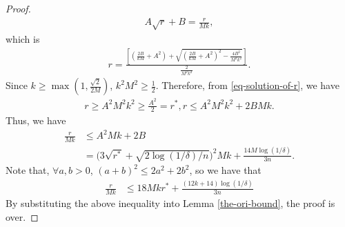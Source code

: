 \documentclass[10pt]{llncs}
\begin{document}
\begin{proof}
\begin{align*}
  A\sqrt{r}+B=\frac{r}{Mk},
\end{align*}
which is
\begin{align}
\label{eq-solution-of-r}
  r=\frac{\left[
  \left(
    \frac{2B}{kM}+A^2
    \right)+
    \sqrt{\left(
    \frac{2B}{kM}+A^2
    \right)^2-\frac{4B^2}{M^2k^2}}
  \right]}
  {\frac{2}{M^2k^2}}.
\end{align}
Since $k\geq \max(1,\frac{\sqrt{2}}{2M})$,
$k^2M^2\geq \frac{1}{2}$.
Therefore, from \eqref{eq-solution-of-r}, we have
\begin{align*}
  r\geq A^2M^2k^2\geq \frac{A^2}{2}= r^\ast,
  r\leq A^2M^2k^2+2BMk.
\end{align*}
Thus, we have
\begin{align*}
 \frac{r}{Mk}&\leq A^2Mk+2B \\
 &=\Big(3\sqrt{r^\ast}+\sqrt{{2\log(1/\delta)}/{n}}\Big)^2Mk+\frac{14M\log(1/\delta)}{3n}.
\end{align*}
Note that, $\forall a,b>0$, $(a+b)^2\leq 2a^2+2b^2$,
so we have that
\begin{align*}
  \frac{r}{Mk}&\leq 18Mkr^\ast+\frac{(12k+14)\log(1/\delta)}{3n}
\end{align*}
By substituting the above inequality
 into Lemma \ref{the-ori-bound},
the proof is over.
\end{proof}
\end{document}
